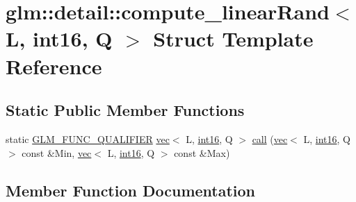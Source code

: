\hypertarget{structglm_1_1detail_1_1compute__linear_rand_3_01_l_00_01int16_00_01_q_01_4}{}\section{glm\+:\+:detail\+:\+:compute\+\_\+linear\+Rand$<$ L, int16, Q $>$ Struct Template Reference}
\label{structglm_1_1detail_1_1compute__linear_rand_3_01_l_00_01int16_00_01_q_01_4}
\subsection*{Static Public Member Functions}
\begin{DoxyCompactItemize}
\item 
static \mbox{\hyperlink{setup_8hpp_a33fdea6f91c5f834105f7415e2a64407}{G\+L\+M\+\_\+\+F\+U\+N\+C\+\_\+\+Q\+U\+A\+L\+I\+F\+I\+ER}} \mbox{\hyperlink{structglm_1_1vec}{vec}}$<$ L, \mbox{\hyperlink{namespaceglm_1_1detail_a375938874ca4f0a0982ec6373b56117b}{int16}}, Q $>$ \mbox{\hyperlink{structglm_1_1detail_1_1compute__linear_rand_3_01_l_00_01int16_00_01_q_01_4_a9a3d3514acfa5f0895c900485d754a18}{call}} (\mbox{\hyperlink{structglm_1_1vec}{vec}}$<$ L, \mbox{\hyperlink{namespaceglm_1_1detail_a375938874ca4f0a0982ec6373b56117b}{int16}}, Q $>$ const \&Min, \mbox{\hyperlink{structglm_1_1vec}{vec}}$<$ L, \mbox{\hyperlink{namespaceglm_1_1detail_a375938874ca4f0a0982ec6373b56117b}{int16}}, Q $>$ const \&Max)
\end{DoxyCompactItemize}


\subsection{Member Function Documentation}
\mbox{\label{structglm_1_1detail_1_1compute__linear_rand_3_01_l_00_01int16_00_01_q_01_4_a9a3d3514acfa5f0895c900485d754a18}} 
